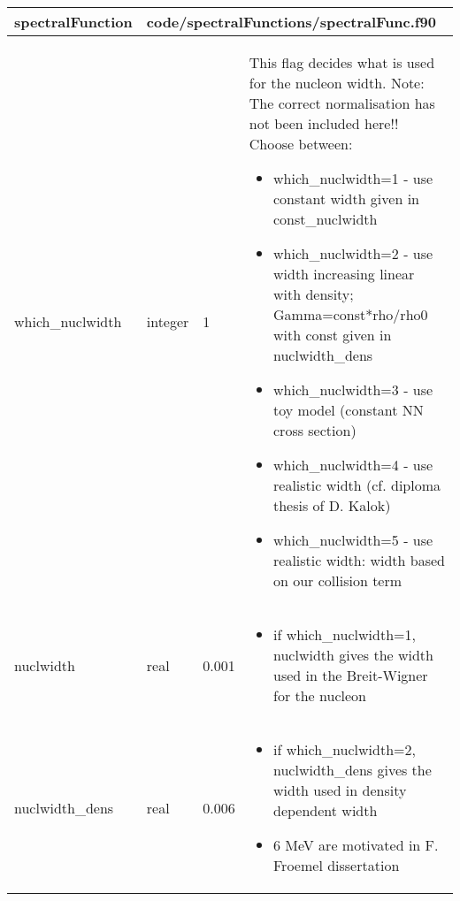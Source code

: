 \documentclass{article}
\begin{document}
\begin{longtable}{llll}
\toprule
\textbf{\large{spectralFunction}} & \multicolumn{3}{l}{\footnotesize{code/spectralFunctions/spectralFunc.f90}}\\*
\midrule
\endfirsthead
\midrule
\endhead
which\_nuclwidth & \begin{minipage}[t]{2cm}integer\end{minipage} & \begin{minipage}[t]{2cm}1\end{minipage} & \begin{minipage}[t]{12cm}This flag decides what is used for the nucleon width. Note: The correct normalisation has not been included here!! Choose between:\begin{itemize}\leftmargin0em\itemindent0pt\item which\_nuclwidth=1 - use constant width given in const\_nuclwidth\item which\_nuclwidth=2 - use width increasing linear with density;   Gamma=const*rho/rho0 with const given in nuclwidth\_dens\item which\_nuclwidth=3 - use toy model (constant NN cross section)\item which\_nuclwidth=4 - use realistic width (cf. diploma thesis of D. Kalok)\item which\_nuclwidth=5 - use realistic width: width based on our collision term\end{itemize}\end{minipage}\\*
\midrule
nuclwidth & \begin{minipage}[t]{2cm}real\end{minipage} & \begin{minipage}[t]{2cm}0.001\end{minipage} & \begin{minipage}[t]{12cm}\begin{itemize}\leftmargin0em\itemindent0pt\item if which\_nuclwidth=1, nuclwidth gives the width used in the Breit-Wigner for the nucleon\end{itemize}\end{minipage}\\*
\midrule
nuclwidth\_dens & \begin{minipage}[t]{2cm}real\end{minipage} & \begin{minipage}[t]{2cm}0.006\end{minipage} & \begin{minipage}[t]{12cm}\begin{itemize}\leftmargin0em\itemindent0pt\item if which\_nuclwidth=2, nuclwidth\_dens gives the width used in density dependent width\item 6 MeV are motivated in F. Froemel dissertation\end{itemize}\end{minipage}\\*

\end{longtable}
\end{document}
